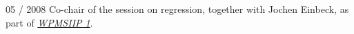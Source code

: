 \documentclass[a4paper]{simplecv}
\begin{document}
\begin{topic}
\item[05 / 2008] Co-chair of the session on regression, together with Jochen Einbeck,
                 as part of \emph{\href{http://www.maths.dur.ac.uk/users/matthias.troffaes/workshopip2008/index.html}{WPMSIIP 1}}.
\end{topic}




\renewcommand\refname{List of publications}
\label{publications}

%
\end{document}
